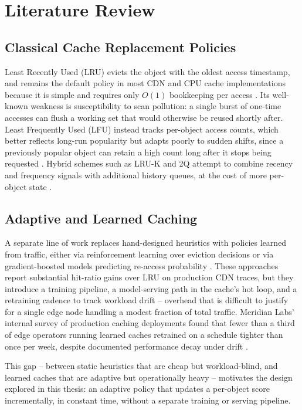 \chapter{Literature Review}
\label{ch:literature-review}

\section{Classical Cache Replacement Policies}
Least Recently Used (LRU) evicts the object with the oldest access timestamp, and remains the
default policy in most CDN and CPU cache implementations because it is simple and requires
only $O(1)$ bookkeeping per access \citep{whitfield2019caching}. Its well-known weakness is
susceptibility to scan pollution: a single burst of one-time accesses can flush a working set
that would otherwise be reused shortly after. Least Frequently Used (LFU) instead tracks
per-object access counts, which better reflects long-run popularity but adapts poorly to
sudden shifts, since a previously popular object can retain a high count long after it stops
being requested \citep{carter2020frequency}. Hybrid schemes such as LRU-K and 2Q attempt to
combine recency and frequency signals with additional history queues, at the cost of more
per-object state \citep{osei2021hybrid}.

\section{Adaptive and Learned Caching}
\label{sec:lit-gap}
A separate line of work replaces hand-designed heuristics with policies learned from traffic,
either via reinforcement learning over eviction decisions \citep{nair2022learned} or via
gradient-boosted models predicting re-access probability \citep{apex2023predictive}. These
approaches report substantial hit-ratio gains over LRU on production CDN traces, but they
introduce a training pipeline, a model-serving path in the cache's hot loop, and a
retraining cadence to track workload drift -- overhead that is difficult to justify for a
single edge node handling a modest fraction of total traffic. Meridian Labs' internal survey
of production caching deployments found that fewer than a third of edge operators running
learned caches retrained on a schedule tighter than once per week, despite documented
performance decay under drift \citep{whitfield2019caching}.

This gap -- between static heuristics that are cheap but workload-blind, and learned caches
that are adaptive but operationally heavy -- motivates the design explored in this thesis: an
adaptive policy that updates a per-object score incrementally, in constant time, without a
separate training or serving pipeline.

